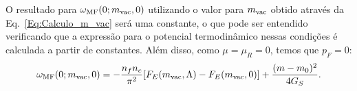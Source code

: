 O resultado  para $\omega_{\rm{MF}}(0;m_{\rm{vac}},0)$ utilizando o valor para $m_{\rm{vac}}$ obtido através da Eq.~\eqref{Eq:Calculo_m_vac} será uma constante, o que pode ser entendido verificando que a expressão para o potencial termodinâmico nessas condições é calculada a partir de constantes. Além disso, como $\mu = \mu_R = 0$, temos que $p_F = 0$:
\begin{equation}\label{Eq:Pot_termodinamico_1_vacuo}
\omega_{\rm{MF}}(0;m_{\rm{vac}},0) = - \frac{n_f n_c}{\pi^2}[F_E(m_{\rm{vac}},\Lambda) - F_E(m_{\rm{vac}}, 0)] + \frac{(m-m_0)^2}{4G_S}.
\end{equation}

%
%
%
%	
%

